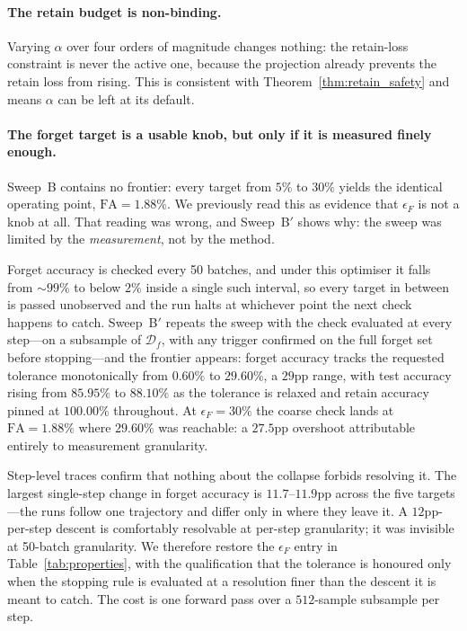 \documentclass{article}
\newcommand{\Df}{\mathcal{D}_f}
\theoremstyle{remark}
\theoremstyle{plain}
\begin{document}
\paragraph{The retain budget is non-binding.}
Varying $\alpha$ over four orders of magnitude changes nothing: the retain-loss
constraint is never the active one, because the projection already prevents the
retain loss from rising. This is consistent with Theorem~\ref{thm:retain_safety}
and means $\alpha$ can be left at its default.

\paragraph{The forget target is a usable knob, but only if it is measured
finely enough.} Sweep~B contains no frontier: every target from $5\%$ to $30\%$
yields the identical operating point, $\mathrm{FA} = 1.88\%$. We previously read
this as evidence that $\epsilon_F$ is not a knob at all. That reading was wrong,
and Sweep~B$'$ shows why: the sweep was limited by the \emph{measurement}, not
by the method.

Forget accuracy is checked every 50 batches, and under this optimiser it falls
from ${\sim}99\%$ to below $2\%$ inside a single such interval, so every target
in between is passed unobserved and the run halts at whichever point the next
check happens to catch. Sweep~B$'$ repeats the sweep with the check evaluated at
every step---on a subsample of $\Df$, with any trigger confirmed on the full
forget set before stopping---and the frontier appears: forget accuracy tracks
the requested tolerance monotonically from $0.60\%$ to $29.60\%$, a $29$pp
range, with test accuracy rising from $85.95\%$ to $88.10\%$ as the tolerance is
relaxed and retain accuracy pinned at $100.00\%$ throughout. At
$\epsilon_F = 30\%$ the coarse check lands at $\mathrm{FA} = 1.88\%$ where
$29.60\%$ was reachable: a $27.5$pp overshoot attributable entirely to
measurement granularity.

Step-level traces confirm that nothing about the collapse forbids resolving it.
The largest single-step change in forget accuracy is $11.7$--$11.9$pp across
the five targets---the runs follow one trajectory and differ only in where they
leave it. A $12$pp-per-step descent is comfortably resolvable at
per-step granularity; it was invisible at 50-batch granularity. We therefore
restore the $\epsilon_F$ entry in Table~\ref{tab:properties}, with the
qualification that the tolerance is honoured only when the stopping rule is
evaluated at a resolution finer than the descent it is meant to catch. The cost
is one forward pass over a $512$-sample subsample per step.
\end{document}
